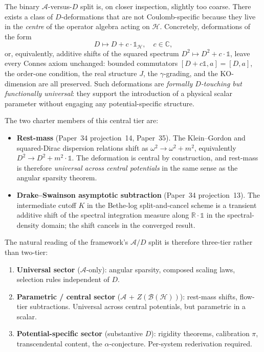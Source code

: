 \documentclass[twocolumn,pra,amsmath,amssymb,superscriptaddress]{revtex4-2}
\begin{document}
The binary $\mathcal{A}$-versus-$D$ split is, on closer inspection,
slightly too coarse.  There exists a class of $D$-deformations
that are not Coulomb-specific because they live in the
\emph{centre} of the operator algebra acting on $\mathcal{H}$.
Concretely, deformations of the form
\[
D \mapsto D + c \cdot \mathbb{1}_{\mathcal{H}},
\quad c \in \mathbb{C},
\]
or, equivalently, additive shifts of the squared spectrum
$D^2 \mapsto D^2 + c \cdot \mathbb{1}$, leave every Connes axiom
unchanged: bounded commutators $[D + c\mathbb{1}, a] = [D, a]$,
the order-one condition, the real structure $J$, the
$\gamma$-grading, and the $\mathrm{KO}$-dimension are all
preserved.  Such deformations are
\emph{formally $D$-touching but functionally universal}: they
support the introduction of a physical scalar parameter without
engaging any potential-specific structure.

The two charter members of this central tier are:
\begin{itemize}
\item \textbf{Rest-mass} (Paper~34 projection~14, Paper~35).
  The Klein--Gordon and squared-Dirac dispersion relations shift
  as $\omega^2 \to \omega^2 + m^2$, equivalently
  $D^2 \to D^2 + m^2 \cdot \mathbb{1}$.  The deformation is
  central by construction, and rest-mass is therefore
  \emph{universal across central potentials} in the same sense
  as the angular sparsity theorem.
\item \textbf{Drake--Swainson asymptotic subtraction}
  (Paper~34 projection~13).  The intermediate
  cutoff $K$ in the Bethe-log split-and-cancel scheme is a
  transient additive shift of the spectral integration measure
  along $\mathbb{R} \cdot \mathbb{1}$ in the spectral-density
  domain; the shift cancels in the converged result.
\end{itemize}

The natural reading of the framework's $\mathcal{A}/D$ split is
therefore three-tier rather than two-tier:
\begin{enumerate}
\item \textbf{Universal sector} ($\mathcal{A}$-only): angular
  sparsity, composed scaling laws, selection rules independent of
  $D$.
\item \textbf{Parametric / central sector}
  ($\mathcal{A}$ + $Z(\mathcal{B}(\mathcal{H}))$): rest-mass
  shifts, flow-tier subtractions.  Universal across central
  potentials, but parametric in a scalar.
\item \textbf{Potential-specific sector} (substantive $D$):
  rigidity theorems, calibration $\pi$, transcendental content,
  the $\alpha$-conjecture.  Per-system rederivation required.
\end{enumerate}
\end{document}
